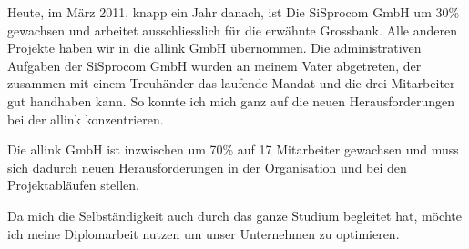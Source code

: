 Heute, im März 2011, knapp ein Jahr danach, ist Die SiSprocom GmbH um 30\% 
gewachsen und arbeitet ausschliesslich für die erwähnte Grossbank. Alle anderen Projekte
haben wir in die allink GmbH übernommen. Die administrativen Aufgaben der
SiSprocom GmbH wurden an
meinem Vater abgetreten, der zusammen mit einem Treuhänder das laufende
Mandat und die drei Mitarbeiter gut handhaben kann. So konnte ich mich ganz
auf die neuen Herausforderungen bei der allink konzentrieren.

Die allink GmbH ist inzwischen um 70\% auf 17 Mitarbeiter gewachsen und muss sich dadurch
neuen Herausforderungen in der Organisation und bei den Projektabläufen stellen.

Da mich die Selbständigkeit auch durch das ganze Studium begleitet hat, möchte 
ich meine Diplomarbeit nutzen um unser Unternehmen zu optimieren.